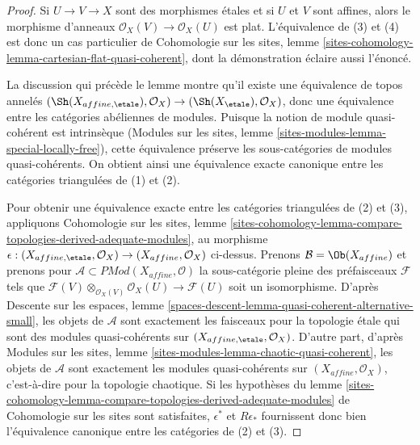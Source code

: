 \begin{proof}
Si $U\to V\to X$ sont des morphismes \'etales et si $U$ et $V$ sont affines,
alors le morphisme d'anneaux
$\mathcal{O}_X(V)\to\mathcal{O}_X(U)$ est plat. L'\'equivalence de (3) et (4)
est donc un cas particulier de Cohomologie sur les sites, lemme
\ref{sites-cohomology-lemma-cartesian-flat-quasi-coherent}, dont la
d\'emonstration \'eclaire aussi l'\'enonc\'e.

\medskip\noindent
La discussion qui pr\'ec\`ede le lemme montre qu'il existe une \'equivalence de
topos annel\'es
$(\Sh(X_{affine,\etale}),\mathcal{O}_X)\to
(\Sh(X_\etale),\mathcal{O}_X)$, donc une \'equivalence entre les cat\'egories
ab\'eliennes de modules. Puisque la notion de module quasi-coh\'erent est
intrins\`eque (Modules sur les sites, lemme
\ref{sites-modules-lemma-special-locally-free}), cette \'equivalence pr\'eserve
les sous-cat\'egories de modules quasi-coh\'erents. On obtient ainsi une
\'equivalence exacte canonique entre les cat\'egories triangul\'ees de (1) et
(2).

\medskip\noindent
Pour obtenir une \'equivalence exacte entre les cat\'egories triangul\'ees de
(2) et (3), appliquons Cohomologie sur les sites, lemme
\ref{sites-cohomology-lemma-compare-topologies-derived-adequate-modules}, au
morphisme
$\epsilon:(X_{affine,\etale},\mathcal{O}_X)\to
(X_{affine},\mathcal{O}_X)$ ci-dessus. Prenons
$\mathcal{B}=\Ob(X_{affine})$ et prenons pour
$\mathcal{A}\subset\textit{PMod}(X_{affine},\mathcal{O})$ la sous-cat\'egorie
pleine des pr\'efaisceaux $\mathcal{F}$ tels que
$\mathcal{F}(V)\otimes_{\mathcal{O}_X(V)}\mathcal{O}_X(U)\to\mathcal{F}(U)$
soit un isomorphisme. D'apr\`es Descente sur les espaces, lemme
\ref{spaces-descent-lemma-quasi-coherent-alternative-small}, les objets de
$\mathcal{A}$ sont exactement les faisceaux pour la topologie \'etale qui sont
des modules quasi-coh\'erents sur
$(X_{affine,\etale},\mathcal{O}_X)$. D'autre part, d'apr\`es Modules sur les
sites, lemme \ref{sites-modules-lemma-chaotic-quasi-coherent}, les objets de
$\mathcal{A}$ sont exactement les modules quasi-coh\'erents sur
$(X_{affine},\mathcal{O}_X)$, c'est-\`a-dire pour la topologie chaotique. Si les
hypoth\`eses du lemme
\ref{sites-cohomology-lemma-compare-topologies-derived-adequate-modules} de
Cohomologie sur les sites sont satisfaites, $\epsilon^*$ et $R\epsilon_*$
fournissent donc bien l'\'equivalence canonique entre les cat\'egories de (2) et
(3).


\end{proof}
